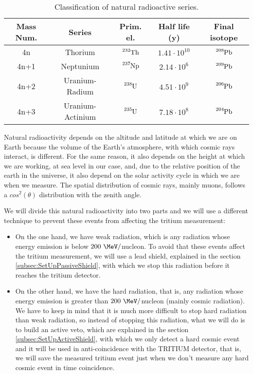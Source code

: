 \begin{table}[htbp]
\begin{center}
\begin{tabular}{|c|c|c|c|c|}
\hline
Mass Num. & Series & Prim. el. & Half life (y) & Final isotope \\
\hline \hline \hline
4n & Thorium & $\ce{^{232}Th}$ & $1.41 \cdot{} 10^{10}$ & $\ce{^{208}Pb}$ \\ \hline
4n+1 & Neptunium & $\ce{^{237}Np}$ & $2.14 \cdot{} 10^{6}$ & $\ce{^{209}Pb}$ \\ \hline
4n+2 & Uranium-Radium & $\ce{^{238}U}$ & $4.51 \cdot{} 10^{9}$ & $\ce{^{206}Pb}$ \\ \hline
4n+3 & Uranium-Actinium & $\ce{^{235}U}$ & $7.18 \cdot{} 10^{8}$ & $\ce{^{204}Pb}$ \\ \hline
\end{tabular}
\caption{Classification of natural radioactive series.\cite{}}
\label{tab:NaturalRadioactiveSeries}
\end{center}
\end{table}

Natural radioactivity depends on the altitude and latitude at which we are on Earth because the volume of the Earth's atmosphere, with which cosmic rays interact, is different. For the same reason, it also depends on the height at which we are working, at sea level in our case, and, due to the relative position of the earth in the universe, it also depend on the solar activity cycle in which we are when we measure. The spatial distribution of cosmic rays, mainly muons, follows a $cos^2(\theta)$ distribution with the zenith angle. %

We will divide this natural radioactivity into two parts and we will use a different technique to prevent these events from affecting the tritium measurement:

\begin{itemize}

\item{}  On the one hand, we have weak radiation, which is any radiation whose energy emission is below $200~\MeV/$nucleon. To avoid that these events affect the tritium measurement, we will use a lead shield, explained in the section \ref{subsec:SetUpPassiveShield}, with which we stop this radiation before it reaches the tritium detector.

\item{} On the other hand, we have the hard radiation, that is, any radiation whose energy emission is greater than $200~\MeV/$nucleon (mainly cosmic radiation). We have to keep in mind that it is much more difficult to stop hard radiation than weak radiation, so instead of stopping this radiation, what we will do is to build an active veto, which are explained in the section \ref{subsec:SetUpActiveShield}, with which we only detect a hard cosmic event and it will be used in anti-coincidence with the TRITIUM detector, that is, we will save the measured tritium event just when we don't measure any hard cosmic event in time coincidence.

\end{itemize}